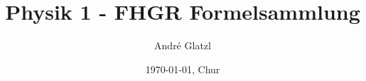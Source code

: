\documentclass[11pt]{article}
\title{Physik 1 - FHGR Formelsammlung}
\author{André Glatzl}
\date{\today{}, Chur}
\begin{document}
\scriptsize



\end{document}
